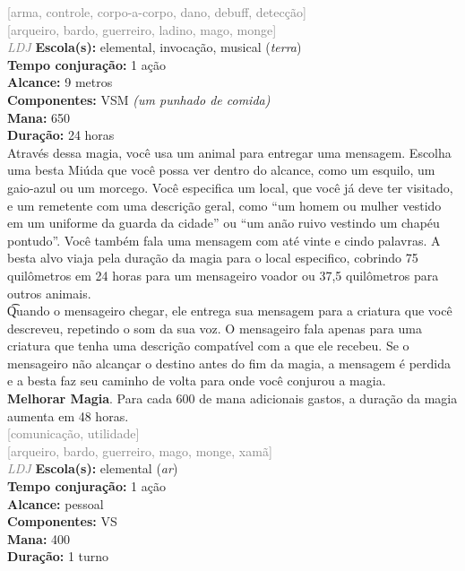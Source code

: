 \documentclass{RPG_Adventure}[2021/10/20]
\begin{document}
{\scriptsize \textcolor{gray}{[arma, controle, corpo-a-corpo, dano, debuff, detecção]\\}}
{\scriptsize \textcolor{gray}{[arqueiro, bardo, guerreiro, ladino, mago, monge]\\}}
{\tiny \textcolor{gray}{\textit{LDJ}}}\jump{}
{\small \t \textbf{Escola(s):} elemental, invocação, musical (\textit{terra})\\\t \textbf{Tempo conjuração:} 1 ação\\\t \textbf{Alcance:} 9 metros\\\t \textbf{Componentes:} VSM \textit{(um punhado de comida)}\\\t \textbf{Mana:} 650\\\t \textbf{Duração:} 24 horas\\}
{\normalsize Através dessa magia, você usa um animal para entregar uma mensagem. Escolha uma besta Miúda que você possa ver dentro do alcance, como um esquilo, um gaio-azul ou um morcego. Você especifica um local, que você já deve ter visitado, e um remetente com uma descrição geral, como “um homem ou mulher vestido em um uniforme da guarda da cidade” ou “um anão ruivo vestindo um chapéu pontudo”. Você também fala uma mensagem com até vinte e cindo palavras. A besta alvo viaja pela duração da magia para o local especifico, cobrindo 75 quilômetros em 24 horas para um mensageiro voador ou 37,5 quilômetros para outros animais.\\\t Quando o mensageiro chegar, ele entrega sua mensagem para a criatura que você descreveu, repetindo o som da sua voz. O mensageiro fala apenas para uma criatura que tenha uma descrição compatível com a que ele recebeu. Se o mensageiro não alcançar o destino antes do fim da magia, a mensagem é perdida e a besta faz seu caminho de volta para onde você conjurou a magia.\\\t \textbf{Melhorar Magia}. Para cada 600 de mana adicionais gastos, a duração da magia aumenta em 48 horas.\\}
{\scriptsize \textcolor{gray}{[comunicação, utilidade]\\}}
{\scriptsize \textcolor{gray}{[arqueiro, bardo, guerreiro, mago, monge, xamã]\\}}
{\tiny \textcolor{gray}{\textit{LDJ}}}\jump{}
{\small \t \textbf{Escola(s):} elemental (\textit{ar})\\\t \textbf{Tempo conjuração:} 1 ação\\\t \textbf{Alcance:} pessoal\\\t \textbf{Componentes:} VS\\\t \textbf{Mana:} 400\\\t \textbf{Duração:} 1 turno\\}
\end{document}
